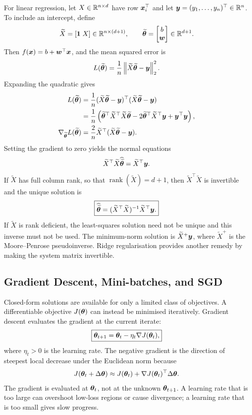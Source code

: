 For linear regression, let $X\in\mathbb{R}^{n\times d}$ have row $\bm{x}_i^{\top}$ and let $\bm{y}=(y_1,\ldots,y_n)^{\top}\in\mathbb{R}^n$. To include an intercept, define
\[
  \widetilde X=[\bm{1}\;X]\in\mathbb{R}^{n\times(d+1)},
  \qquad
  \widetilde{\bm{\theta}}
  =\begin{bmatrix}b\\\bm{w}\end{bmatrix}\in\mathbb{R}^{d+1}.
\]
Then $f(\bm{x})=b+\bm{w}^{\top}\bm{x}$, and the mean squared error is
\[
  L(\widetilde{\bm{\theta}})
  =\frac1n\left\lVert \widetilde X\widetilde{\bm{\theta}}-\bm{y}\right\rVert_2^2.
\]
Expanding the quadratic gives
\begin{align*}
  L(\widetilde{\bm{\theta}})
  &=\frac1n(\widetilde X\widetilde{\bm{\theta}}-\bm{y})^{\top}
    (\widetilde X\widetilde{\bm{\theta}}-\bm{y})\\
  &=\frac1n\left(
      \widetilde{\bm{\theta}}^{\top}\widetilde X^{\top}\widetilde X
      \widetilde{\bm{\theta}}
      -2\widetilde{\bm{\theta}}^{\top}\widetilde X^{\top}\bm{y}
      +\bm{y}^{\top}\bm{y}
    \right),\\
  \nabla_{\widetilde{\bm{\theta}}}L(\widetilde{\bm{\theta}})
  &=\frac{2}{n}\widetilde X^{\top}
    (\widetilde X\widetilde{\bm{\theta}}-\bm{y}).
\end{align*}
Setting the gradient to zero yields the normal equations
\[
  \widetilde X^{\top}\widetilde X\widehat{\widetilde{\bm{\theta}}}
  =\widetilde X^{\top}\bm{y}.
\]
If $\widetilde X$ has full column rank, so that $\operatorname{rank}(\widetilde X)=d+1$, then $\widetilde X^{\top}\widetilde X$ is invertible and the unique solution is
\[
  \boxed{
  \widehat{\widetilde{\bm{\theta}}}
  =(\widetilde X^{\top}\widetilde X)^{-1}
    \widetilde X^{\top}\bm{y}.}
\]
If $\widetilde X$ is rank deficient, the least-squares solution need not be unique and this inverse must not be used. The minimum-norm solution is $\widetilde X^{+}\bm{y}$, where $\widetilde X^{+}$ is the Moore--Penrose pseudoinverse. Ridge regularisation provides another remedy by making the system matrix invertible.

\subsection{Gradient Descent, Mini-batches, and SGD}

Closed-form solutions are available for only a limited class of objectives. A differentiable objective $J(\bm{\theta})$ can instead be minimised iteratively. Gradient descent evaluates the gradient at the current iterate:
\[
  \boxed{
  \bm{\theta}_{t+1}
  =\bm{\theta}_t-\eta_t\nabla J(\bm{\theta}_t),}
\]
where $\eta_t>0$ is the learning rate. The negative gradient is the direction of steepest local decrease under the Euclidean norm because
\[
  J(\bm{\theta}_t+\Delta\bm{\theta})
  \approx J(\bm{\theta}_t)
  +\nabla J(\bm{\theta}_t)^{\top}\Delta\bm{\theta}.
\]
The gradient is evaluated at $\bm{\theta}_t$, not at the unknown $\bm{\theta}_{t+1}$. A learning rate that is too large can overshoot low-loss regions or cause divergence; a learning rate that is too small gives slow progress.

